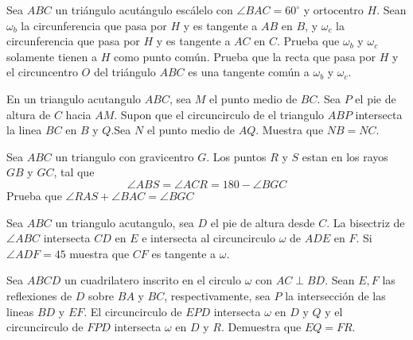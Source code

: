 \documentclass[11pt]{scrartcl}
\newcommand{\gad}{\textcolor{yellow}{$\bigstar$}}
\newcommand{\thmdifficulty}{0}
\newcommand{\problemdiff}[1]{\renewcommand{\thmdifficulty}{#1}}
\begin{document}
\problemdiff{3}
\begin{problem}%
    Sea $ABC$ un triángulo acutángulo escálelo con $\angle BAC=60^{\circ}$ y ortocentro $H$. Sean $\omega_b$ la circunferencia que pasa por $H$ y es tangente a $AB$ en $B$, y $\omega_c$ la circunferencia que pasa por $H$ y es tangente a $AC$ en $C$. Prueba que $\omega_b$ y $\omega_c$ solamente tienen a $H$ como punto común.  Prueba que la recta que pasa por $H$ y el circuncentro $O$ del triángulo $ABC$ es una tangente común a $\omega_b$ y $\omega_c$.
 
\end{problem}

\problemdiff{4}
\begin{problem} %
    En un triangulo acutangulo $ABC$, sea $M$ el punto medio de $BC$. Sea $P$ el pie de altura de $C$ hacia $AM$. Supon que el circuncirculo de el triangulo $ABP$ intersecta la linea $BC$ en $B$ y $Q$.Sea $N$ el punto medio de $AQ$. Muestra que $NB=NC$.
\end{problem}



\problemdiff{5}
\begin{problem} [\gad] %
    Sea $ABC$ un triangulo con gravicentro $G$. Los puntos $R$ y $S$ estan en los rayos $GB$ y $GC$, tal que 
    $$\angle ABS=\angle ACR=180-\angle BGC$$
    Prueba que $\angle RAS+\angle BAC=\angle BGC$
\end{problem}

\problemdiff{5}
\begin{problem}
    Sea $ABC$ un triangulo acutangulo, sea $D$ el pie de altura desde $C$. La bisectriz de $\angle ABC$ intersecta $CD$ en $E$ e intersecta al circuncirculo $\omega$ de $ADE$ en $F$. Si $\angle ADF=45$ muestra que $CF$ es tangente a $\omega$.
\end{problem}


\problemdiff{6}
\begin{problem}
  Sea $ABCD$ un cuadrilatero inscrito en el circulo $\omega$ con $AC \perp BD$. Sean $E,F$ las reflexiones de $D$ sobre $BA$ y $BC$, respectivamente, sea $P$ la intersecci\'on de las lineas $BD$ y $EF$. El circuncirculo de $EPD$ intersecta $\omega$ en $D$ y $Q$ y el circuncirculo de $FPD$ intersecta $\omega$ en $D$ y $R$. Demuestra que $EQ=FR$.
\end{problem}
\end{document}
